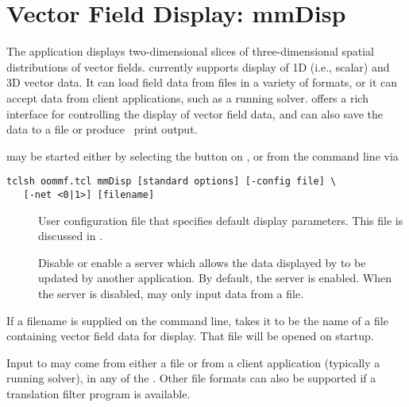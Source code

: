 \chapter{Vector Field Display: mmDisp}\label{sec:mmdisp}%

\begin{center}
\end{center}

The application  displays two-dimensional slices of
three-dimensional spatial distributions of vector fields.  
currently supports display of 1D (i.e., scalar) and 3D vector data.  It
can load field data from files in a variety of formats, or it can accept
data from client applications, such as a running solver.  
offers a rich interface for controlling the display of vector field
data, and can also save the data to a file or produce \postscript\ print
output.

 may be started either by selecting the  button
on , or from the command line via
\begin{verbatim}
tclsh oommf.tcl mmDisp [standard options] [-config file] \
   [-net <0|1>] [filename]
\end{verbatim}

\begin{description}
\item[]
  User configuration file that specifies default display parameters.
  This file is discussed in
  .
\item[]
  Disable or enable a server which allows the data displayed by
   to be updated by another application.
  By default, the server is enabled.  When the server is disabled,
  \app{mmDisp} may only input data from a file.
\end{description}

If a filename is supplied on the command line,  takes
it to be the name of a file containing vector field data for display.
That file will be opened on startup.

Input to  may come from either a file or from a client
application (typically a running solver), in any of the
.
Other file formats can also be supported if a translation filter program
is available.


